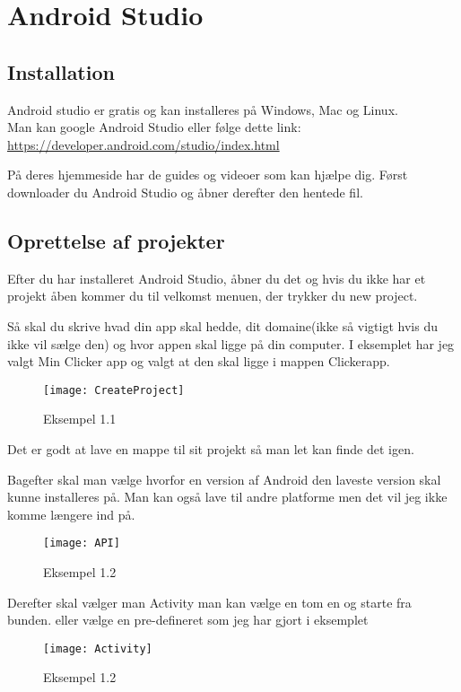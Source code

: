 \chapter{Android Studio}

\section{Installation}
Android studio er gratis og kan installeres på Windows, Mac og Linux.\\
Man kan google Android Studio eller følge dette link:\\
\url{https://developer.android.com/studio/index.html}

På deres hjemmeside har de guides og videoer som kan hjælpe dig.
Først downloader du Android Studio og åbner derefter den hentede fil.

\section{Oprettelse af projekter}
Efter du har installeret Android Studio, åbner du det og hvis du ikke har et projekt åben kommer du til velkomst menuen, der trykker du new project.

Så skal du skrive hvad din app skal hedde, dit domaine(ikke så vigtigt hvis du ikke vil sælge den) og hvor appen skal ligge på din computer. I eksemplet har jeg valgt Min Clicker app og valgt at den skal ligge i mappen Clickerapp. 
\begin{figure}[h]
	\texttt{[image: CreateProject]}
	\caption{Eksempel 1.1}
	\label{fig:createproject}
\end{figure}
Det er godt at lave en mappe til sit projekt så man let kan finde det igen. 

Bagefter skal man vælge hvorfor en version af Android den laveste version skal kunne installeres på. Man kan også lave til andre platforme men det vil jeg ikke komme længere ind på. 
\begin{figure}[h]
	\texttt{[image: API]}
	\caption{Eksempel 1.2}
	\label{fig:API}
\end{figure}

Derefter skal vælger man Activity
man kan vælge en tom en og starte fra bunden. eller vælge en pre-defineret som jeg har gjort i eksemplet

\begin{figure}[h]
	\texttt{[image: Activity]}
	\caption{Eksempel 1.2}
	\label{fig:Activiy}
\end{figure}

